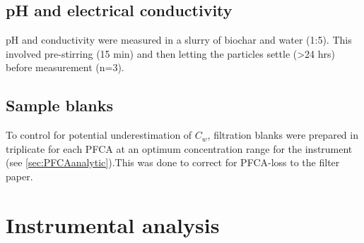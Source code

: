 \subsection{pH and electrical conductivity}
pH and conductivity were measured in a slurry of biochar and water (1:5). This involved pre-stirring (15 min) and then letting the particles settle (\textgreater 24 hrs) before measurement (n=3). 

\subsection{Sample blanks}
To control for potential underestimation of $C_w$, filtration blanks were prepared in triplicate for each PFCA at an optimum concentration range for the instrument (see \cref{sec:PFCAanalytic}).This was done to correct for PFCA-loss to the filter paper. 


\section{Instrumental analysis} \label{methods:instrAnalysis}


